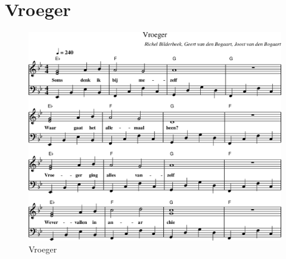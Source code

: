 \chapter{Vroeger}



\begin{figure}[!htbp]
  \includegraphics[width=\textwidth,height=\textheight,keepaspectratio]{../songs/08_vroeger.png}
  \caption{Vroeger}
  \label{fig:08_vroeger}
\end{figure}
